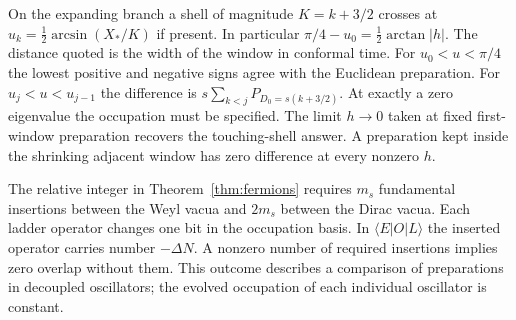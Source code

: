 On the expanding branch a shell of magnitude $K=k+3/2$ crosses at $u_k=\frac12\arcsin(X_*/K)$ if present. In particular $\pi/4-u_0=\frac12\arctan|h|$. The distance quoted is the width of the window in conformal time. For $u_0<u<\pi/4$ the lowest positive and negative signs agree with the Euclidean preparation. For $u_j<u<u_{j-1}$ the difference is $s\sum_{k<j}P_{D_0=s(k+3/2)}$. At exactly a zero eigenvalue the occupation must be specified. The limit $h\to0$ taken at fixed first-window preparation recovers the touching-shell answer. A preparation kept inside the shrinking adjacent window has zero difference at every nonzero $h$.

The relative integer in Theorem~\ref{thm:fermions} requires $m_s$ fundamental insertions between the Weyl vacua and $2m_s$ between the Dirac vacua. Each ladder operator changes one bit in the occupation basis. In $\langle E|O|L\rangle$ the inserted operator carries number $-\Delta N$. A nonzero number of required insertions implies zero overlap without them. This outcome describes a comparison of preparations in decoupled oscillators; the evolved occupation of each individual oscillator is constant.
